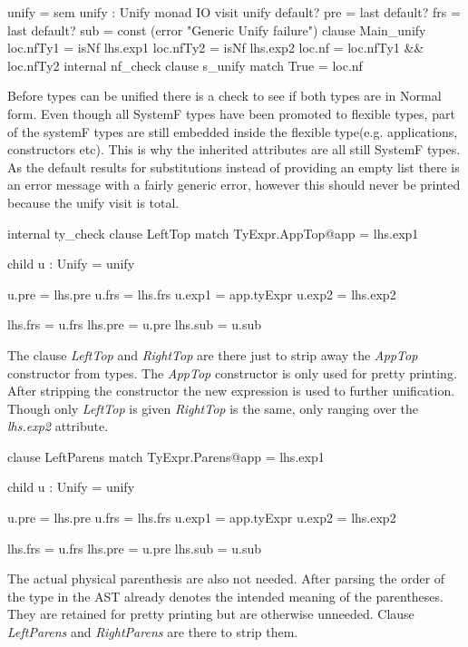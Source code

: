 \begin{code}
unify = sem unify : Unify monad IO    
          visit unify
             default? pre = last
             default? frs = last
             default? sub = const (error "Generic Unify failure")
             clause Main_unify
               loc.nfTy1 = isNf lhs.exp1
               loc.nfTy2 = isNf lhs.exp2
               loc.nf    = loc.nfTy1 && loc.nfTy2
               internal nf_check
                 clause s_unify
                   match True  = loc.nf
\end{code}
Before types can be unified there is a check to see if both types are in Normal form. Even though all SystemF types have been promoted to flexible types, part of the systemF types are still embedded inside the flexible type(e.g. applications, constructors etc). This is why the inherited attributes are all still SystemF types. As the default results for substitutions instead of providing an empty list there is an error message with a fairly generic error, however this should never be printed because the unify visit is total.

\begin{code}
   internal ty_check
     clause LeftTop
       match TyExpr.AppTop@app = lhs.exp1
       
       child u : Unify = unify
       
       u.pre  = lhs.pre
       u.frs  = lhs.frs
       u.exp1 = app.tyExpr
       u.exp2 = lhs.exp2
       
       lhs.frs = u.frs
       lhs.pre = u.pre
       lhs.sub = u.sub
\end{code}
The clause \emph{LeftTop} and \emph{RightTop} are there just to strip away the \emph{AppTop} constructor from types. The \emph{AppTop} constructor is only used for pretty printing. After stripping the constructor the new expression is used to further unification. Though only \emph{LeftTop} is given \emph{RightTop} is the same, only ranging over the \emph{lhs.exp2} attribute.

\begin{code}
   clause LeftParens
     match TyExpr.Parens@app = lhs.exp1
     
     child u : Unify = unify
     
     u.pre  = lhs.pre
     u.frs  = lhs.frs
     u.exp1 = app.tyExpr
     u.exp2 = lhs.exp2
     
     lhs.frs = u.frs
     lhs.pre = u.pre
     lhs.sub = u.sub
\end{code}
The actual physical parenthesis are also not needed. After parsing the order of the type in the AST already denotes the intended meaning of the parentheses. They are retained for pretty printing but are otherwise unneeded. Clause \emph{LeftParens} and \emph{RightParens} are there to strip them.


